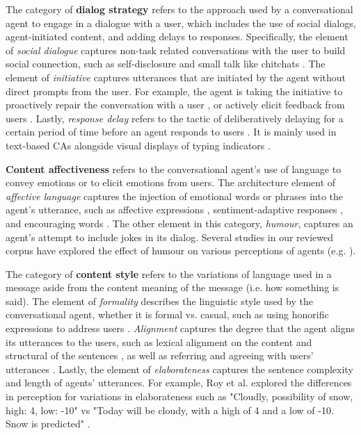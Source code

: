 The category of \textbf{dialog strategy} refers to the approach used by a conversational agent to engage in a dialogue with a user, which includes the use of social dialogs, agent-initiated content, and adding delays to responses. Specifically, the element of \textit{social dialogue} captures non-task related conversations with the user to build social connection, such as self-disclosure \cite{lee2020hear}\cmt{[23]} and small talk like chitchats \cite{lubold2016effects}\cmt{[86]}\cite{volkel2021manipulating}\cmt{[68]}. The element of \textit{initiative} captures utterances that are initiated by the agent without direct prompts from the user. For example, the agent is taking the initiative to proactively repair the conversation with a user \cite{ashktorab2019resilient}\cmt{[88]}\cite{cuadra2021my}\cmt{[67]}, or actively elicit feedback from users \cite{xiao2021let}\cmt{[73]}. Lastly, \textit{response delay} refers to the tactic of deliberatively delaying for a certain period of time before an agent responds to users \cite{gnewuch2018faster}\cmt{[19]}\cite{gnewuch2022opposing}\cmt{[20]}. It is mainly used in text-based CAs alongside visual displays of typing indicators \cite{gnewuch2018chatbot}\cmt{[21]}.

\textbf{Content affectiveness} refers to the conversational agent's use of language to convey emotions or to elicit emotions from users. The architecture element of \textit{affective language} captures the injection of emotional words or phrases into the agent's utterance, such as affective expressions \cite{seeger2021chatbots}\cmt{[35]}\cite{yang2017perceived}\cmt{[44]}\cite{zhu2022effects}\cmt{[26]}, sentiment-adaptive responses \cite{diederich2019emulating}\cmt{[25]}, and encouraging words \cite{healey2013relating}\cmt{[39]}. The other element in this category, \textit{humour}, captures an agent's attempt to include jokes in its dialog. Several studies in our reviewed corpus have explored the effect of humour on various perceptions of agents (e.g. \cite{ceha2021can}\cmt{[57]}\cite{khooshabeh2011does}\cmt{[37]}).

The category of \textbf{content style} refers to the variations of language used in a message aside from the content meaning of the message (i.e. how something is said). The element of \textit{formality} describes the linguistic style used by the conversational agent, whether it is formal vs. casual, such as using honorific expressions to address users \cite{ouchi2019should}\cmt{[59]}. \textit{Alignment} captures the degree that the agent aligns its utterances to the users, such as lexical alignment on the content and structural of the sentences \cite{huiyang2022improving}\cmt{[17]}\cite{linnemann2018can}\cmt{[15]}, as well as referring and agreeing with users' utterances \cite{volkel2021examining}\cmt{[69]}. Lastly, the element of \textit{elaborateness} captures the sentence complexity and length of agents' utterances. For example, Roy et al. explored the differences in perception for variations in elaborateness such as "Cloudly, possibility of snow, high: 4, low: -10" vs "Today will be cloudy, with a high of 4 and a low of -10. Snow is predicted" \cite{roy2021users}\cmt{[71]}.

